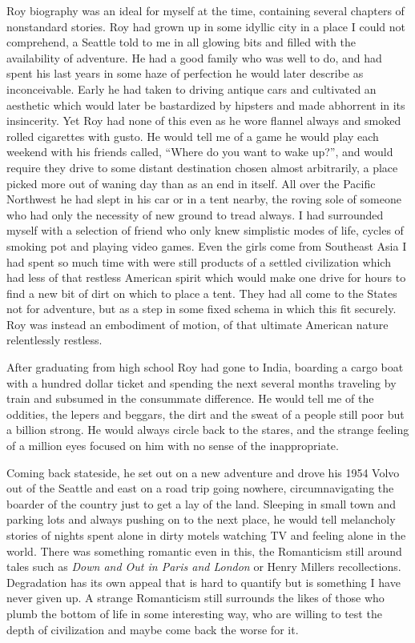 \documentclass[ebook, 10pt, openright, onecolumn]{memoir}
\begin{document}
Roy biography was an ideal for myself at the time, containing several chapters
of nonstandard stories.  Roy had grown up in some idyllic city in a place I
could not comprehend, a Seattle told to me in all glowing bits and filled with
the availability of adventure.  He had a good family who was well to do, and had
spent his last years in some haze of perfection he would later describe as
inconceivable.  Early he had taken to driving antique cars and cultivated an
aesthetic which would later be bastardized by hipsters and made abhorrent in its
insincerity.  Yet Roy had none of this even as he wore flannel always and smoked
rolled cigarettes with gusto.  He would tell me of a game he would play each
weekend with his friends called, ``Where do you want to wake up?'', and would
require they drive to some distant destination chosen almost arbitrarily, a
place picked more out of waning day than as an end in itself.  All over the
Pacific Northwest he had slept in his car or in a tent nearby, the roving sole
of someone who had only the necessity of new ground to tread always.  I had
surrounded myself with a selection of friend who only knew simplistic modes of
life, cycles of smoking pot and playing video games.  Even the girls come from
Southeast Asia I had spent so much time with were still products of a settled
civilization which had less of that restless American spirit which would make
one drive for hours to find a new bit of dirt on which to place a tent.  They
had all come to the States not for adventure, but as a step in some fixed schema
in which this fit securely.  Roy was instead an embodiment of motion, of that
ultimate American nature relentlessly restless.  

After graduating from high school Roy had gone to India, boarding a cargo boat
with a hundred dollar ticket and spending the next several months traveling by
train and subsumed in the consummate difference.  He would tell me of the
oddities, the lepers and beggars, the dirt and the sweat of a people still poor
but a billion strong.  He would always circle back to the stares, and the
strange feeling of a million eyes focused on him with no sense of the
inappropriate.

Coming back stateside, he set out on a new adventure and drove his 1954 Volvo
out of the Seattle and east on a road trip going nowhere, circumnavigating the
boarder of the country just to get a lay of the land. Sleeping in small town and
parking lots and always pushing on to the next place, he would tell melancholy
stories of nights spent alone in dirty motels watching TV and feeling alone in
the world.  There was something romantic even in this, the Romanticism still
around tales such as \textit{Down and Out in Paris and London} or Henry Millers
recollections.  Degradation has its own appeal that is hard to quantify but is
something I have never given up.  A strange Romanticism still surrounds the
likes of those who plumb the bottom of life in some interesting way, who are
willing to test the depth of civilization and maybe come back the worse for it.
\end{document}
